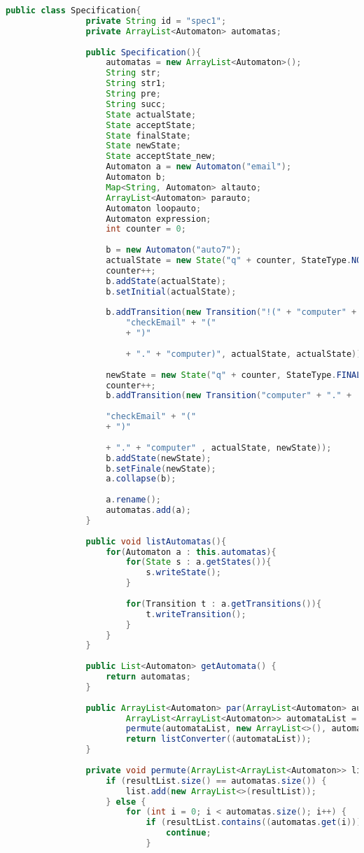 \begin{lstlisting}[language=java, caption={példa unit teszteset.},captionpos=b]
			public class Specification{
				private String id = "spec1";
				private ArrayList<Automaton> automatas;
				
				public Specification(){
					automatas = new ArrayList<Automaton>();
					String str;
					String str1;
					String pre;
					String succ;
					State actualState;
					State acceptState;
					State finalState;
					State newState;
					State acceptState_new;
					Automaton a = new Automaton("email");
					Automaton b;
					Map<String, Automaton> altauto;
					ArrayList<Automaton> parauto;
					Automaton loopauto;
					Automaton expression;
					int counter = 0;
					
					b = new Automaton("auto7");
					actualState = new State("q" + counter, StateType.NORMAL);
					counter++;
					b.addState(actualState);
					b.setInitial(actualState);
														
					b.addTransition(new Transition("!(" + "computer" + "." +	
						"checkEmail" + "("
						+ ")"
						
						+ "." + "computer)", actualState, actualState));
					
					newState = new State("q" + counter, StateType.FINAL);
					counter++;
					b.addTransition(new Transition("computer" + "." +
					
					"checkEmail" + "("
					+ ")"
					
					+ "." + "computer" , actualState, newState));
					b.addState(newState);
					b.setFinale(newState);
					a.collapse(b);
					
					a.rename();
					automatas.add(a);
				}
				
				public void listAutomatas(){
					for(Automaton a : this.automatas){
						for(State s : a.getStates()){
							s.writeState();	
						}
						
						for(Transition t : a.getTransitions()){
							t.writeTransition();
						}
					}
				}
				
				public List<Automaton> getAutomata() {
					return automatas;
				}
				
				public ArrayList<Automaton> par(ArrayList<Automaton> automatas) {
						ArrayList<ArrayList<Automaton>> automataList = new ArrayList<>();
						permute(automataList, new ArrayList<>(), automatas);
						return listConverter((automataList));
				}
			
				private void permute(ArrayList<ArrayList<Automaton>> list, ArrayList<Automaton> resultList, ArrayList<Automaton> automatas) {
					if (resultList.size() == automatas.size()) {
						list.add(new ArrayList<>(resultList));
					} else {
						for (int i = 0; i < automatas.size(); i++) {
							if (resultList.contains((automatas.get(i)))) {
								continue;
							}
			

\end{lstlisting}
